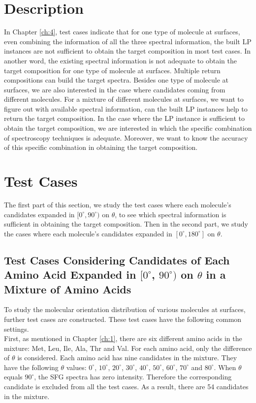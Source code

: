  \label{ch:5}
\section{Description}

In Chapter \ref{ch:4}, test cases indicate that for one type of molecule at surfaces, even combining the information of all the three spectral information, the built LP instances are not sufficient to obtain the target composition in most test cases. In another word, the existing spectral information is not adequate to obtain the target composition for one type of molecule at surfaces. Multiple return compositions can build the target spectra. Besides one type of molecule at surfaces, we are also interested in the case where candidates coming from different molecules. For a mixture of different molecules at surfaces, we want to figure out with available spectral information, can the built LP instances help to return the target composition. In the case where the LP instance is sufficient to obtain the target composition, we are interested in which the specific combination of spectroscopy techniques is adequate. Moreover, we want to know the accuracy of this specific combination in obtaining the target composition. \\

\section{Test Cases}
The first part of this section, we study the test cases where each molecule's candidates expanded in $[0^{\circ}, 90^{\circ})$ on $\theta$, to see which spectral information is sufficient in obtaining the target composition. Then in the second part, we study the cases where each molecule's candidates expanded in $[0^{\circ}, 180^{\circ}]$ on $\theta$. \\

\subsection{Test Cases Considering Candidates of Each Amino Acid Expanded in $[0^{\circ}$, $90^{\circ})$ on $\theta$ in a Mixture of Amino Acids} \label{testcase51}
To study the molecular orientation distribution of various molecules at surfaces, further test cases are constructed. These test cases have the following common settings. \\

First, as mentioned in Chapter \ref{ch:1}, there are six different amino acids in the mixture: Met, Leu, Ile, Ala, Thr and Val. For each amino acid, only the difference of $\theta$ is considered. Each amino acid has nine candidates in the mixture. They have the following $\theta$ values: $0^{\circ}$,  $10^{\circ}$, $20^{\circ}$, $30^{\circ}$, $40^{\circ}$, $50^{\circ}$, $60^{\circ}$, $70^{\circ}$ and $80^{\circ}$. When $\theta$ equals $90^{\circ}$, the SFG spectra has zero intensity. Therefore the corresponding candidate is excluded from all the test cases. As a result, there are 54 candidates in the mixture. \\

